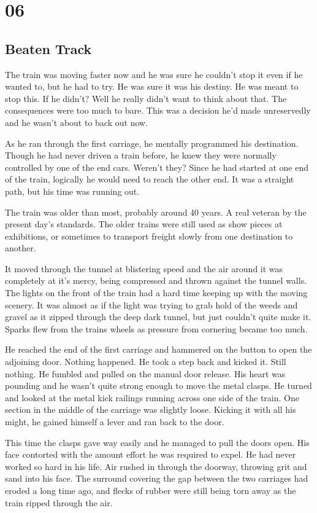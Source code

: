 \chapter{06}
\section{Beaten Track}


The train was moving faster now and he was sure he couldn't stop it even if he wanted to, but he had to try.  He was sure it was his destiny.  He was meant to stop this.  If he didn't?  Well he really didn't want to think about that.  The consequences were too much to bare.  This was a decision he'd made unreservedly and he wasn't about to back out now.

As he ran through the first carriage, he mentally programmed his destination.  Though he had never driven a train before, he knew they were normally controlled by one of the end cars.  Weren't they?  Since he had started at one end of the train, logically he would need to reach the other end.  It was a straight path, but his time was running out.

The train was older than most, probably around 40 years.  A real veteran by the present day's standards.  The older trains were still used as show pieces at exhibitions, or sometimes to transport freight slowly from one destination to another.  

It moved through the tunnel at blistering speed and the air around it was completely at it's mercy, being compressed and thrown against the tunnel walls.  The lights on the front of the train had a hard time keeping up with the moving scenery.  It was almost as if the light was trying to grab hold of the weeds and gravel as it zipped through the deep dark tunnel, but just couldn't quite make it.  Sparks flew from the trains wheels as pressure from cornering became too much.  

He reached the end of the first carriage and hammered on the button to open the adjoining door.  Nothing happened.  He took a step back and kicked it.  Still nothing.  He fumbled and pulled on the manual door release.  His heart was pounding and he wasn't quite strong enough to move the metal clasps.  He turned and looked at the metal kick railings running across one side of the train.  One section in the middle of the carriage was slightly loose.  Kicking it with all his might, he gained himself a lever and ran back to the door.

This time the clasps gave way easily and he managed to pull the doors open.  His face contorted with the amount effort he was required to expel.  He had never worked so hard in his life.  Air rushed in through the doorway, throwing grit and sand into his face.  The surround covering the gap between the two carriages had eroded a long time ago, and flecks of rubber were still being torn away as the train ripped through the air.

